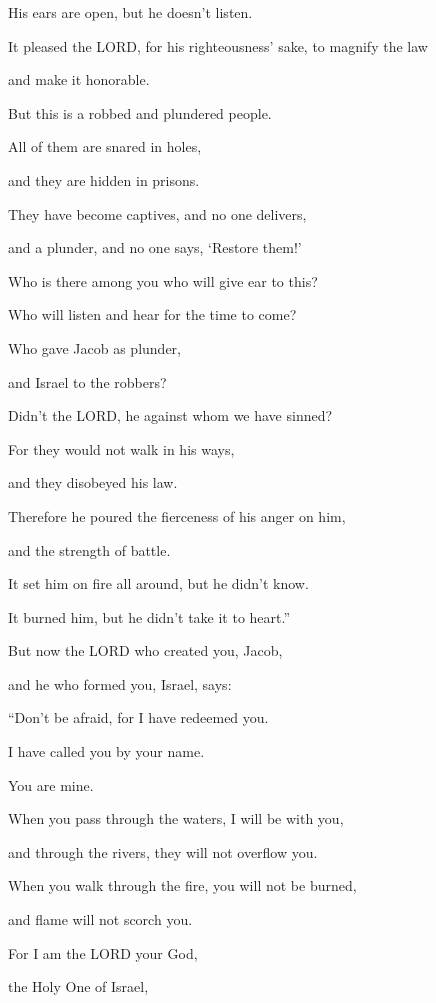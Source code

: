 His ears are open, but he doesn’t listen.

\myverse{}It pleased the LORD, for his righteousness’ sake, to magnify
the law

and make it honorable.

\myverse{}But this is a robbed and plundered people.

All of them are snared in holes,

and they are hidden in prisons.

They have become captives, and no one delivers,

and a plunder, and no one says, ‘Restore them!’


\vspace{\baselineskip} \myverse{}Who is there among you who will give ear to this?

Who will listen and hear for the time to come?

\myverse{}Who gave Jacob as plunder,

and Israel to the robbers?

Didn’t the LORD, he against whom we have sinned?

For they would not walk in his ways,

and they disobeyed his law.

\myverse{}Therefore he poured the fierceness of his anger on him,

and the strength of battle.

It set him on fire all around, but he didn’t know.

It burned him, but he didn’t take it to heart.”


\mychapter{} \myverse*{}But now the LORD who created you, Jacob,

\quad\quad and he who formed you, Israel, says:

“Don’t be afraid, for I have redeemed you.

I have called you by your name.

You are mine.

\myverse{}When you pass through the waters, I will be with you,

and through the rivers, they will not overflow you.

When you walk through the fire, you will not be burned,

and flame will not scorch you.

\myverse{}For I am the LORD your God,

the Holy One of Israel,

